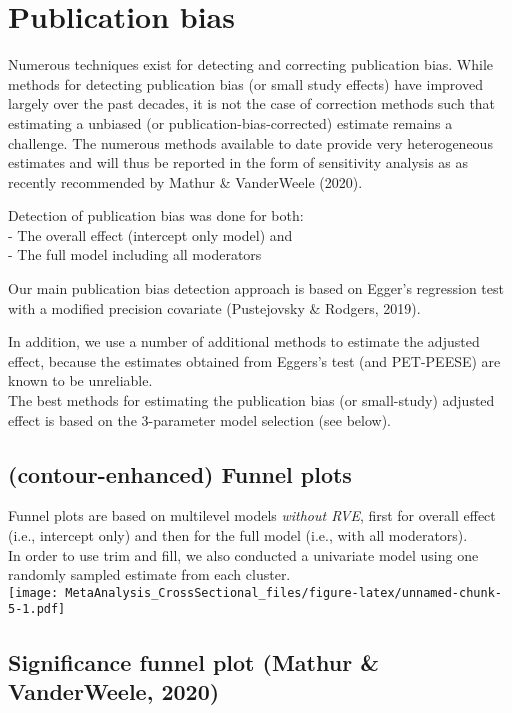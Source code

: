 \documentclass[
]{book}
\begin{document}
\hypertarget{publication-bias}{%
\section{Publication bias}\label{publication-bias}}

Numerous techniques exist for detecting and correcting publication bias.
While methods for detecting publication bias (or small study effects) have
improved largely over the past decades, it is not the case of correction methods
such that estimating a unbiased (or publication-bias-corrected) estimate remains a challenge.
The numerous methods available to date provide very heterogeneous estimates and will thus
be reported in the form of sensitivity analysis as as recently recommended by
Mathur \& VanderWeele (2020).

Detection of publication bias was done for both:\\
- The overall effect (intercept only model) and\\
- The full model including all moderators

Our main publication bias detection approach is based on Egger's regression test
with a modified precision covariate (Pustejovsky \& Rodgers, 2019).

In addition, we use a number of additional methods to estimate the adjusted effect,
because the estimates obtained from Eggers's test (and PET-PEESE) are known to be
unreliable.\\
The best methods for estimating the publication bias (or small-study) adjusted effect
is based on the 3-parameter model selection (see below).

\hypertarget{contour-enhanced-funnel-plots}{%
\subsection{(contour-enhanced) Funnel plots}\label{contour-enhanced-funnel-plots}}

Funnel plots are based on multilevel models \emph{without RVE}, first for overall effect (i.e., intercept only)
and then for the full model (i.e., with all moderators).\\
In order to use trim and fill, we also conducted a univariate model using one randomly sampled estimate
from each cluster.\\
\texttt{[image: MetaAnalysis\_CrossSectional\_files/figure-latex/unnamed-chunk-5-1.pdf]}

\hypertarget{significance-funnel-plot-mathur-vanderweele-2020}{%
\subsection{Significance funnel plot (Mathur \& VanderWeele, 2020)}\label{significance-funnel-plot-mathur-vanderweele-2020}}
\end{document}
